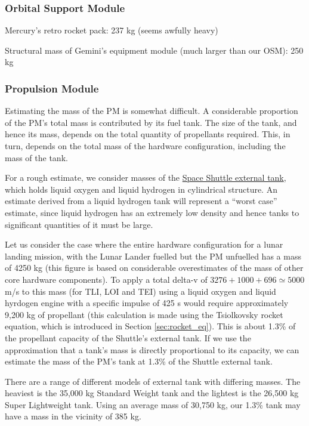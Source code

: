 \documentclass{report}
\begin{document}
\subsubsection{Orbital Support Module}

Mercury's retro rocket pack: 237 kg (seems awfully heavy)

Structural mass of Gemini's equipment module (much larger than our OSM): 250 kg

\subsubsection{Propulsion Module}

Estimating the mass of the PM is somewhat difficult.  A considerable proportion of the PM's total mass is contributed by its fuel tank.  The size of the tank, and hence its mass, depends on the total quantity of propellants required.  This, in turn, depends on the total mass of the hardware configuration, including the mass of the tank.

For a rough estimate, we consider masses of the \href{http://en.wikipedia.org/wiki/Space_Shuttle_external_tank}{Space Shuttle external tank}, which holds liquid oxygen and liquid hydrogen in cylindrical structure.  An estimate derived from a liquid hydrogen tank will represent a ``worst case'' estimate, since liquid hydrogen has an extremely low density and hence tanks to significant quantities of it must be large.

Let us consider the case where the entire hardware configuration for a lunar landing mission, with the Lunar Lander fuelled but the PM unfuelled has a mass of 4250 kg (this figure is based on considerable overestimates of the mass of other core hardware components).  To apply a total delta-v of $3276 + 1000 + 696 \simeq 5000$ m/s to this mass (for TLI, LOI and TEI) using a liquid oxygen and liquid hyrdogen engine with a specific impulse of 425 s would require approximately 9,200 kg of propellant (this calculation is made using the Tsiolkovsky rocket equation, which is introduced in Section \ref{sec:rocket_eq}).  This is about 1.3\% of the propellant capacity of the Shuttle's external tank.  If we use the approximation that a tank's mass is directly proportional to its capacity, we can estimate the mass of the PM's tank at 1.3\% of the Shuttle external tank.

There are a range of different models of external tank with differing masses.  The heaviest is the 35,000 kg Standard Weight tank and the lightest is the 26,500 kg Super Lightweight tank.  Using an average mass of 30,750 kg, our 1.3\% tank may have a mass in the vicinity of 385 kg.
\end{document}
